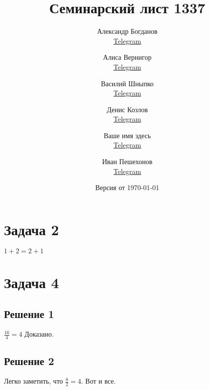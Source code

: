 \documentclass[a4paper]{article}
\title{Семинарский лист 1337}
\author{
    Александр Богданов \\ \href{https://t.me/SphericalPotatoInVacuum}{Telegram} \and
    Алиса Вернигор     \\ \href{https://t.me/allisyonok}{Telegram} \and
    Василий Шныпко     \\ \href{https://t.me/yourvash}{Telegram} \and
    Денис Козлов       \\ \href{https://t.me/DKozl50}{Telegram} \and
    Ваше имя здесь     \\ \href{https://t.me/hjhkjhrkjhklsjhfkfldjh}{Telegram} \and
    Иван Пешехонов     \\ \href{https://t.me/JohanDDC}{Telegram}
}
\date{Версия от {\ddmmyyyydate\today} \currenttime}
\begin{document}
    \maketitle

    \section*{Задача 2}
    $1 + 2 = 2 + 1$

    \section*{Задача 4}
    \subsection*{Решение 1}
    $\frac{16}{4} = 4$ Доказано.

    \subsection*{Решение 2}
    Легко заметить, что $\frac{8}{2} = 4$. Вот и все.
\end{document}
